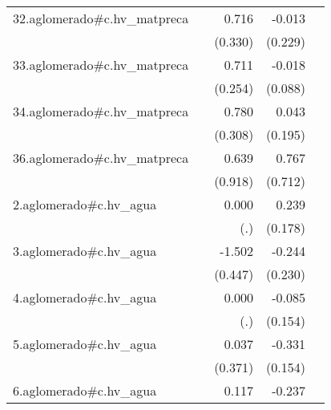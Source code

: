 {\begin{longtable}{l*{4}{D{.}{.}{-1}}}
\addlinespace
32.aglomerado#c.hv\_matpreca&                     &       0.716\sym{*}  &      -0.013         &                     \\
            &                     &     (0.330)         &     (0.229)         &                     \\
\addlinespace
33.aglomerado#c.hv\_matpreca&                     &       0.711\sym{**} &      -0.018         &                     \\
            &                     &     (0.254)         &     (0.088)         &                     \\
\addlinespace
34.aglomerado#c.hv\_matpreca&                     &       0.780\sym{*}  &       0.043         &                     \\
            &                     &     (0.308)         &     (0.195)         &                     \\
\addlinespace
36.aglomerado#c.hv\_matpreca&                     &       0.639         &       0.767         &                     \\
            &                     &     (0.918)         &     (0.712)         &                     \\
\addlinespace
2.aglomerado#c.hv\_agua&                     &       0.000         &       0.239         &                     \\
            &                     &         (.)         &     (0.178)         &                     \\
\addlinespace
3.aglomerado#c.hv\_agua&                     &      -1.502\sym{***}&      -0.244         &                     \\
            &                     &     (0.447)         &     (0.230)         &                     \\
\addlinespace
4.aglomerado#c.hv\_agua&                     &       0.000         &      -0.085         &                     \\
            &                     &         (.)         &     (0.154)         &                     \\
\addlinespace
5.aglomerado#c.hv\_agua&                     &       0.037         &      -0.331\sym{*}  &                     \\
            &                     &     (0.371)         &     (0.154)         &                     \\
\addlinespace
6.aglomerado#c.hv\_agua&                     &       0.117         &      -0.237         &                     \\

\end{longtable}}
